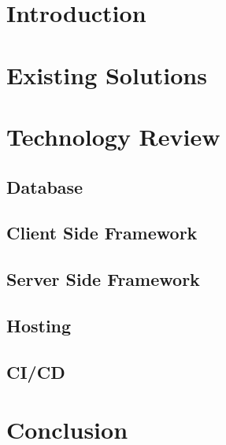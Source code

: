 \section{Introduction}
\section{Existing Solutions}
\section{Technology Review}
\subsection{Database}
\subsection{Client Side Framework}
\subsection{Server Side Framework}
\subsection{Hosting}
\subsection{CI/CD}
\section{Conclusion}
